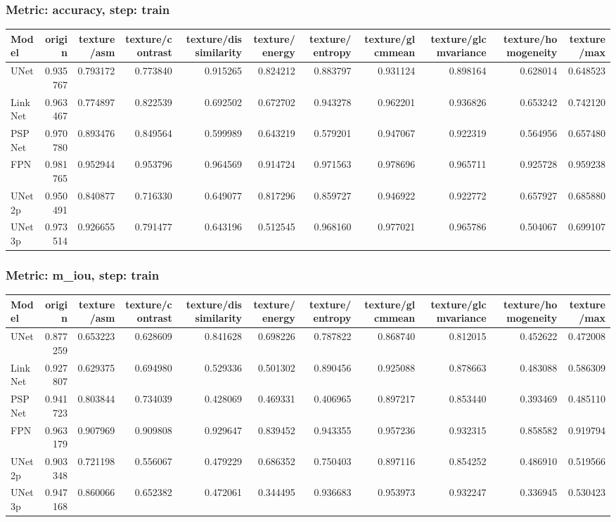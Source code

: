 \documentclass{article}
\begin{document}
\subsubsection{Metric: accuracy, step: train}
\begin{tabular}{lrrrrrrrrrr}
\toprule
Model & origin & texture/asm & texture/contrast & texture/dissimilarity & texture/energy & texture/entropy & texture/glcmmean & texture/glcmvariance & texture/homogeneity & texture/max \\
\midrule
UNet & 0.935767 & 0.793172 & 0.773840 & 0.915265 & 0.824212 & 0.883797 & 0.931124 & 0.898164 & 0.628014 & 0.648523 \\
LinkNet & 0.963467 & 0.774897 & 0.822539 & 0.692502 & 0.672702 & 0.943278 & 0.962201 & 0.936826 & 0.653242 & 0.742120 \\
PSPNet & 0.970780 & 0.893476 & 0.849564 & 0.599989 & 0.643219 & 0.579201 & 0.947067 & 0.922319 & 0.564956 & 0.657480 \\
FPN & 0.981765 & 0.952944 & 0.953796 & 0.964569 & 0.914724 & 0.971563 & 0.978696 & 0.965711 & 0.925728 & 0.959238 \\
UNet2p & 0.950491 & 0.840877 & 0.716330 & 0.649077 & 0.817296 & 0.859727 & 0.946922 & 0.922772 & 0.657927 & 0.685880 \\
UNet3p & 0.973514 & 0.926655 & 0.791477 & 0.643196 & 0.512545 & 0.968160 & 0.977021 & 0.965786 & 0.504067 & 0.699107 \\
\bottomrule
\end{tabular}

\subsubsection{Metric: m\_iou, step: train}
\begin{tabular}{lrrrrrrrrrr}
\toprule
Model & origin & texture/asm & texture/contrast & texture/dissimilarity & texture/energy & texture/entropy & texture/glcmmean & texture/glcmvariance & texture/homogeneity & texture/max \\
\midrule
UNet & 0.877259 & 0.653223 & 0.628609 & 0.841628 & 0.698226 & 0.787822 & 0.868740 & 0.812015 & 0.452622 & 0.472008\\
LinkNet & 0.927807 & 0.629375 & 0.694980 & 0.529336 & 0.501302 & 0.890456 & 0.925088 & 0.878663 & 0.483088 & 0.586309 \\
PSPNet & 0.941723 & 0.803844 & 0.734039 & 0.428069 & 0.469331 & 0.406965 & 0.897217 & 0.853440 & 0.393469 & 0.485110 \\
FPN & 0.963179 & 0.907969 & 0.909808 & 0.929647 & 0.839452 & 0.943355 & 0.957236 & 0.932315 & 0.858582 & 0.919794 \\
UNet2p & 0.903348 & 0.721198 & 0.556067 & 0.479229 & 0.686352 & 0.750403 & 0.897116 & 0.854252 & 0.486910 & 0.519566 \\
UNet3p & 0.947168 & 0.860066 & 0.652382 & 0.472061 & 0.344495 & 0.936683 & 0.953973 & 0.932247 & 0.336945 & 0.530423 \\
\bottomrule
\end{tabular}
\end{document}
